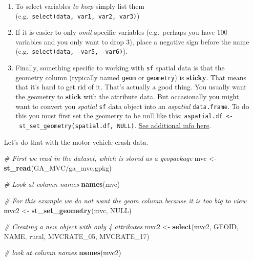 \documentclass[
]{book}
\newenvironment{Shaded}{\begin{snugshade}}{\end{snugshade}}
\newcommand{\CommentTok}[1]{\textcolor[rgb]{0.56,0.35,0.01}{\textit{#1}}}
\newcommand{\ConstantTok}[1]{\textcolor[rgb]{0.56,0.35,0.01}{#1}}
\newcommand{\FunctionTok}[1]{\textcolor[rgb]{0.13,0.29,0.53}{\textbf{#1}}}
\newcommand{\NormalTok}[1]{#1}
\newcommand{\OtherTok}[1]{\textcolor[rgb]{0.56,0.35,0.01}{#1}}
\newcommand{\StringTok}[1]{\textcolor[rgb]{0.31,0.60,0.02}{#1}}
\providecommand{\tightlist}{%
  \setlength{\itemsep}{0pt}\setlength{\parskip}{0pt}}
\begin{document}
\begin{enumerate}
\def\labelenumi{\arabic{enumi}.}
\tightlist
\item
  To select variables \emph{to keep} simply list them (e.g.~\texttt{select(data,\ var1,\ var2,\ var3)})
\item
  If it is easier to only \emph{omit} specific variables (e.g.~perhaps you have 100 variables and you only want to drop 3), place a negative sign before the name (e.g.~\texttt{select(data,\ -var5,\ -var6)}).
\item
  Finally, something specific to working with \texttt{sf} spatial data is that the geometry column (typically named \texttt{geom} or \texttt{geometry}) is \textbf{sticky}. That means that it's hard to get rid of it. That's actually a good thing. You usually want the geometry to \textbf{stick} with the attribute data. But occasionally you might want to convert you \emph{spatial} \texttt{sf} data object into an \emph{aspatial} \texttt{data.frame}. To do this you must first set the geometry to be null like this: \texttt{aspatial.df\ \textless{}-\ st\_set\_geometry(spatial.df,\ NULL)}. \protect\hyperlink{sf-overview}{See additional info here}.
\end{enumerate}

Let's do that with the motor vehicle crash data.

\begin{Shaded}
\begin{Highlighting}[]
\CommentTok{\# First we read in the dataset, which is stored as a geopackage}
\NormalTok{mvc }\OtherTok{\textless{}{-}} \FunctionTok{st\_read}\NormalTok{(}\StringTok{\textquotesingle{}GA\_MVC/ga\_mvc.gpkg\textquotesingle{}}\NormalTok{)}

\CommentTok{\# Look at column names}
\FunctionTok{names}\NormalTok{(mvc)}

\CommentTok{\# For this example we do not want the geom column because it is too big to view}
\NormalTok{mvc2 }\OtherTok{\textless{}{-}} \FunctionTok{st\_set\_geometry}\NormalTok{(mvc, }\ConstantTok{NULL}\NormalTok{)}

\CommentTok{\# Creating a new object with only 4 attributes}
\NormalTok{mvc2 }\OtherTok{\textless{}{-}} \FunctionTok{select}\NormalTok{(mvc2, GEOID, NAME, rural, MVCRATE\_05, MVCRATE\_17)}

\CommentTok{\# look at column names}
\FunctionTok{names}\NormalTok{(mvc2)}
\end{Highlighting}
\end{Shaded}
\end{document}
